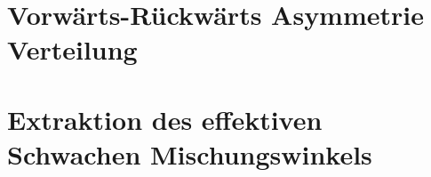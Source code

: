 











\section{Vorwärts-Rückwärts Asymmetrie Verteilung}
\label{afb:afb}




\section{Extraktion des effektiven Schwachen Mischungswinkels}
\label{afb:sin2theta}

 


